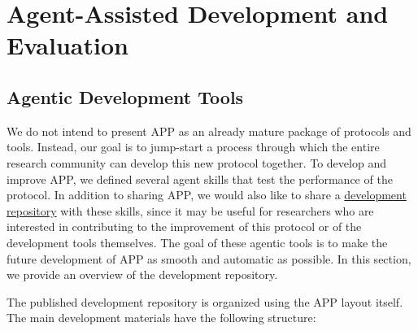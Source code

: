\documentclass{article}
\newcommand{\devrepourl}{https://github.com/XiaoliangQi/agentic-publication-protocol-dev.app}
\begin{document}
\section{Agent-Assisted Development and Evaluation}\label{sec: dev-tools}

\subsection{Agentic Development Tools}
We do not intend to present APP as an already mature package of protocols and tools. Instead, our goal is to jump-start a process through which the entire research community can develop this new protocol together. To develop and improve APP, we defined several agent skills that test the performance of the protocol. In addition to sharing APP, we would also like to share a \href{\devrepourl}{development repository} with these skills, since it may be useful for researchers who are interested in contributing to the improvement of this protocol or of the development tools themselves. The goal of these agentic tools is to make the future development of APP as smooth and automatic as possible. In this section, we provide an overview of the development repository.

The published development repository is organized using the APP layout itself.
The main development materials have the following structure:

\begin{center}
\end{center}
\end{document}
